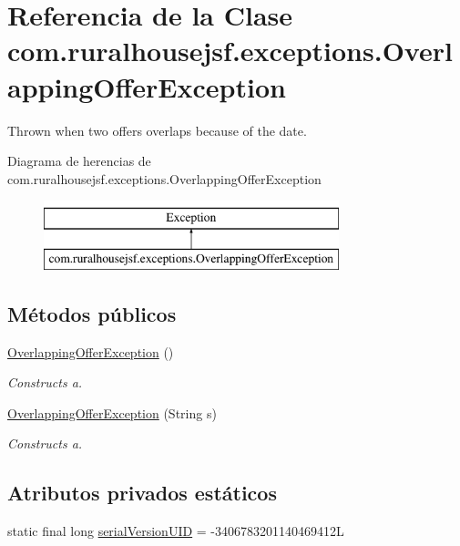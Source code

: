 \hypertarget{classcom_1_1ruralhousejsf_1_1exceptions_1_1_overlapping_offer_exception}{}\section{Referencia de la Clase com.\+ruralhousejsf.\+exceptions.\+Overlapping\+Offer\+Exception}
\label{classcom_1_1ruralhousejsf_1_1exceptions_1_1_overlapping_offer_exception}


Thrown when two offers overlaps because of the date.  


Diagrama de herencias de com.\+ruralhousejsf.\+exceptions.\+Overlapping\+Offer\+Exception\begin{figure}[H]
\begin{center}
\leavevmode
\includegraphics[height=2.000000cm]{dd/d98/classcom_1_1ruralhousejsf_1_1exceptions_1_1_overlapping_offer_exception}
\end{center}
\end{figure}
\subsection*{Métodos públicos}
\begin{DoxyCompactItemize}
\item 
\mbox{\hyperlink{classcom_1_1ruralhousejsf_1_1exceptions_1_1_overlapping_offer_exception_a2386ba3955f5299aeb00c053d4f831fb}{Overlapping\+Offer\+Exception}} ()
\begin{DoxyCompactList}\small\item\em Constructs a. \end{DoxyCompactList}\item 
\mbox{\hyperlink{classcom_1_1ruralhousejsf_1_1exceptions_1_1_overlapping_offer_exception_a7961de1dd207f4d451ba28b8b343a283}{Overlapping\+Offer\+Exception}} (String s)
\begin{DoxyCompactList}\small\item\em Constructs a. \end{DoxyCompactList}\end{DoxyCompactItemize}
\subsection*{Atributos privados estáticos}
\begin{DoxyCompactItemize}
\item 
static final long \mbox{\hyperlink{classcom_1_1ruralhousejsf_1_1exceptions_1_1_overlapping_offer_exception_aaff379d27ee36188b92cd4ed2ee2010e}{serial\+Version\+U\+ID}} = -\/3406783201140469412L
\end{DoxyCompactItemize}


